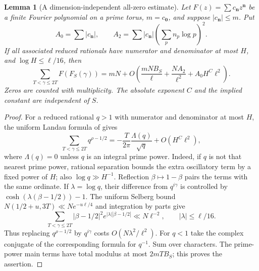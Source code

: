 \documentclass[11pt,letterpaper]{article}
\newtheorem{lemma}[theorem]{Lemma}
\theoremstyle{definition}
\theoremstyle{remark}
\newcommand{\1}{\mathbf 1}
\begin{document}
\begin{lemma}[A dimension-independent all-zero estimate]
\label{p04:lem:growing-landau}
Let $F(z)=\sum c_{\mathbf n}z^{\mathbf n}$ be a finite Fourier
polynomial on a prime torus, $m=c_{\mathbf0}$, and suppose
$|c_{\mathbf n}|\le m$. Put
\[
 A_0=\sum|c_{\mathbf n}|,\qquad
 A_2=\sum|c_{\mathbf n}|
       \left(\sum_p n_p\log p\right)^2.
\]
If all associated reduced rationals have numerator and denominator
at most $H$, and $\log H\le\ell/16$, then
\[
 \sum_{T<\gamma\le2T}F(F_S(\gamma))
 =mN+O\left(\frac{mNB_S}{\ell}
       +\frac{NA_2}{\ell^2}+A_0H^{C}\ell^2\right).
\]
Zeros are counted with multiplicity. The absolute exponent $C$ and
the implied constant are independent of $S$.
\end{lemma}
\begin{proof}
For a reduced rational $q>1$ with numerator and denominator at most
$H$, the uniform Landau formula of \cite[Lemma~1]{FordZaharescu}
gives
\[
 \sum_{T<\gamma\le2T}q^{\rho-1/2}
 =-\frac{T}{2\pi}\frac{\Lambda(q)}{\sqrt q}
   +O(H^{C}\ell^2),
\]
where $\Lambda(q)=0$ unless $q$ is an integral prime power.
Indeed, if $q$ is not that nearest prime power, rational separation
bounds the extra oscillatory term by a fixed power of $H$; also
$\log q\gg H^{-1}$. Reflection $\beta\mapsto1-\beta$ pairs the
terms with the same ordinate. If $\lambda=\log q$, their difference
from $q^{i\gamma}$ is controlled by
$\cosh(\lambda(\beta-1/2))-1$.
The uniform Selberg bound
$N(1/2+u,3T)\ll N e^{-u\ell/4}$ and integration by parts give
\[
 \sum_{T<\gamma\le2T}
  |\beta-1/2|^2 e^{|\lambda||\beta-1/2|}
 \ll N\ell^{-2},\qquad |\lambda|\le\ell/16.
\]
Thus replacing $q^{\rho-1/2}$ by $q^{i\gamma}$ costs
$O(N\lambda^2/\ell^2)$. For $q<1$ take the complex conjugate
of the corresponding formula for $q^{-1}$. Sum over characters.
The prime-power main terms have total modulus at most
$2mTB_S$; this proves the assertion.
\end{proof}
\end{document}
